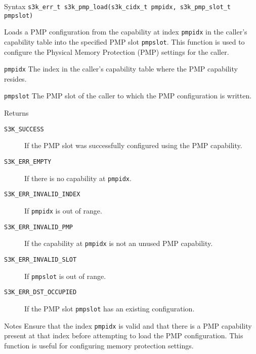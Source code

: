 \documentclass[a4paper,11pt]{article}
\newcommand{\syscall}[1]{\texttt{#1}}
\newenvironment{syscalldoc}[1]{
  \begin{tcolorbox}[breakable,title=\subsection{\syscall{#1}}]
  \begin{description}[leftmargin=!,style=nextline,noitemsep]
}{
  \end{description}
  \end{tcolorbox}
}
\begin{document}
\begin{syscalldoc}{s3k\_pmp\_load}
  \item[Syntax] \lstinline{s3k_err_t s3k_pmp_load(s3k_cidx_t pmpidx, s3k_pmp_slot_t pmpslot)}

  \item[Description] Loads a PMP configuration from the capability at index \verb|pmpidx| in the caller's capability table into the specified PMP slot \verb|pmpslot|. This function is used to configure the Physical Memory Protection (PMP) settings for the caller.

  \item[Parameters]
    \begin{description}
      \item[]
      \item[\texttt{pmpidx}] The index in the caller's capability table where the PMP capability resides.
      \item[\texttt{pmpslot}] The PMP slot of the caller to which the PMP configuration is written.
    \end{description}

  \item[Returns]
    \begin{description}
      \item[]
      \item[\texttt{S3K\_SUCCESS}] If the PMP slot was successfully configured using the PMP capability.
      \item[\texttt{S3K\_ERR\_EMPTY}] If there is no capability at \verb|pmpidx|.
      \item[\texttt{S3K\_ERR\_INVALID\_INDEX}] If \verb|pmpidx| is out of range.
      \item[\texttt{S3K\_ERR\_INVALID\_PMP}] If the capability at \verb|pmpidx| is not an unused PMP capability.
      \item[\texttt{S3K\_ERR\_INVALID\_SLOT}] If \verb|pmpslot| is out of range.
      \item[\texttt{S3K\_ERR\_DST\_OCCUPIED}] If the PMP slot \verb|pmpslot| has an existing configuration.
    \end{description}

  \item[Notes] Ensure that the index \verb|pmpidx| is valid and that there is a PMP capability present at that index before attempting to load the PMP configuration. This function is useful for configuring memory protection settings.
\end{syscalldoc}
\end{document}
